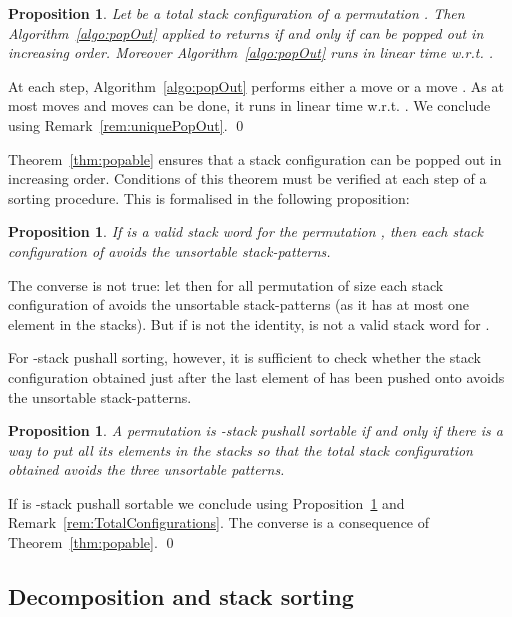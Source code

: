 \documentclass[11pt]{article}
\newenvironment{pf}{{\em \noindent Proof:}}{ \hfill \qed\smallskip}
\newtheorem{prop}[thm]{Proposition}
\newcommand{\pushall}{-stack pushall sortable\xspace}
\newcommand{\ssi}{if and only if\xspace}
\begin{document}
\begin{prop}\label{prop:AlgoPopOut}
Let  be a total stack configuration of a permutation .
Then Algorithm~\ref{algo:popOut} applied to  returns  \ssi  can be popped out in increasing order.
Moreover Algorithm~\ref{algo:popOut} runs in linear time w.r.t. .
\end{prop}

\begin{pf}
At each step, Algorithm~\ref{algo:popOut} performs either a move  or a move . 
As at most  moves  and  moves  can be done, it runs in linear time w.r.t. .
We conclude using Remark~\ref{rem:uniquePopOut}.
\end{pf}


Theorem~\ref{thm:popable} ensures that a stack configuration can be popped out in increasing order. 
Conditions of this theorem must be verified at each step of a sorting procedure. 
This is formalised in the following proposition:

\begin{prop}\label{prop:eachConfigAvoidUnsortablePattern}
If  is a valid stack word for the permutation , 
then each stack configuration of  avoids the  unsortable stack-patterns.
\end{prop}

The converse is not true: let  then for all permutation  of size  
each stack configuration of  avoids the  unsortable stack-patterns (as it has at most one element in the stacks).
But if  is not the identity,  is not a valid stack word for .

For -stack pushall sorting, however, it is sufficient to check whether the stack configuration obtained 
just after the last element of  has been pushed onto  avoids the  unsortable stack-patterns.

\begin{prop}\label{prop:pushallIffConfigurationEvitePatterns}
A permutation  is \pushall if and only if there is a way to put all its elements in the stacks 
so that the total stack configuration obtained avoids the three unsortable patterns.
\end{prop}

\begin{pf}
If  is \pushall we conclude using Proposition~\ref{prop:eachConfigAvoidUnsortablePattern} and Remark~\ref{rem:TotalConfigurations}. 
The converse is a consequence of Theorem~\ref{thm:popable}.
\end{pf}



\subsection{Decomposition and stack sorting}
\end{document}
